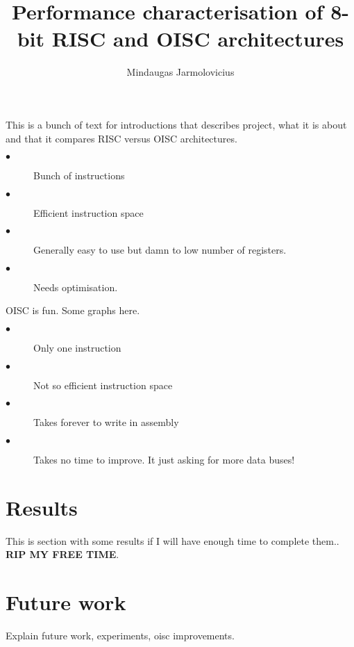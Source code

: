 \documentclass[portrait,color=UCLblack,margin=1.5cm,bannerheight=8cm,logoheight=2.5cm]{uclposter}
\title{Performance characterisation of 8-bit RISC and OISC architectures}
\author{Mindaugas Jarmolovicius}
\begin{document}

\maketitle

\begin{tcolorbox}[title=\large{Introduction}]
	
This is a bunch of text for introductions that describes project, what it is about and that it compares RISC versus OISC architectures.
\end{tcolorbox}


\begin{multicols}{2}
	
\begin{tcolorbox}[title=\large{OISC}]
	\begin{description}
		\item[$\bullet$] Bunch of instructions
		\item[$\bullet$] Efficient instruction space
		\item[$\bullet$] Generally easy to use but damn to low number of registers.
		\item[$\bullet$] Needs optimisation.
	\end{description}
\end{tcolorbox}


\columnbreak


\begin{tcolorbox}[title=\large{OISC}]
	OISC is fun. Some graphs here.
	\begin{description}
		\item[$\bullet$] Only one instruction
		\item[$\bullet$] Not so efficient instruction space
		\item[$\bullet$] Takes forever to write in assembly
		\item[$\bullet$] Takes no time to improve. It just asking for more data buses!
	\end{description}

\end{tcolorbox}

\end{multicols}

\section*{Results}
This is section with some results if I will have enough time to complete them.. \textbf{RIP MY FREE TIME}.

\section*{Future work}
Explain future work, experiments, oisc improvements.
\end{document}

